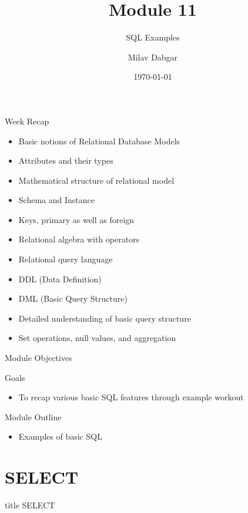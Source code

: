 \documentclass[aspectratio=169, xcolor=dvipsnames]{beamer}
\title{Module 11}
\subtitle{SQL Examples}
\author{Milav Dabgar}
\institute{www.milav.in}
\date{\today}
\begin{document}
\begin{frame}
    \titlepage
\end{frame}

\begin{frame}{Week Recap}
    \begin{itemize}[<+->]
        \item Basic notions of Relational Database Models
        \item Attributes and their types
        \item Mathematical structure of relational model
        \item Schema and Instance
        \item Keys, primary as well as foreign
        \item Relational algebra with operators
        \item Relational query language
        \item DDL (Data Definition)
        \item DML (Basic Query Structure)
        \item Detailed understanding of basic query structure
        \item Set operations, null values, and aggregation
    \end{itemize}
\end{frame}

\begin{frame}{Module Objectives}
    \begin{block}{Goals}
        \begin{itemize}[<+->]
            \item To recap various basic SQL features through example workout
        \end{itemize}
    \end{block}
\end{frame}

\begin{frame}{Module Outline}
    \begin{itemize}[<+->]
        \item Examples of basic SQL
    \end{itemize}
\end{frame}

\section{SELECT}
\begin{frame}
  \vfill
  \centering
  \begin{beamercolorbox}[sep=8pt,center,shadow=true,rounded=true]{title}
    SELECT\par%
  \end{beamercolorbox}
  \vfill
\end{frame}
\end{document}
